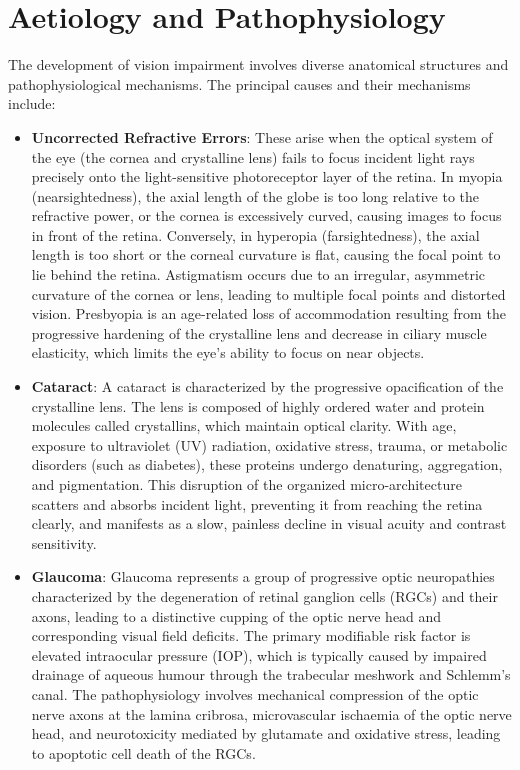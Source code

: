 \section*{Aetiology and Pathophysiology}
The development of vision impairment involves diverse anatomical structures and pathophysiological mechanisms. The principal causes and their mechanisms include:
\begin{itemize}
    \item \textbf{Uncorrected Refractive Errors}: These arise when the optical system of the eye (the cornea and crystalline lens) fails to focus incident light rays precisely onto the light-sensitive photoreceptor layer of the retina. In myopia (nearsightedness), the axial length of the globe is too long relative to the refractive power, or the cornea is excessively curved, causing images to focus in front of the retina. Conversely, in hyperopia (farsightedness), the axial length is too short or the corneal curvature is flat, causing the focal point to lie behind the retina. Astigmatism occurs due to an irregular, asymmetric curvature of the cornea or lens, leading to multiple focal points and distorted vision. Presbyopia is an age-related loss of accommodation resulting from the progressive hardening of the crystalline lens and decrease in ciliary muscle elasticity, which limits the eye's ability to focus on near objects.
    \item \textbf{Cataract}: A cataract is characterized by the progressive opacification of the crystalline lens. The lens is composed of highly ordered water and protein molecules called crystallins, which maintain optical clarity. With age, exposure to ultraviolet (UV) radiation, oxidative stress, trauma, or metabolic disorders (such as diabetes), these proteins undergo denaturing, aggregation, and pigmentation. This disruption of the organized micro-architecture scatters and absorbs incident light, preventing it from reaching the retina clearly, and manifests as a slow, painless decline in visual acuity and contrast sensitivity.
    \item \textbf{Glaucoma}: Glaucoma represents a group of progressive optic neuropathies characterized by the degeneration of retinal ganglion cells (RGCs) and their axons, leading to a distinctive cupping of the optic nerve head and corresponding visual field deficits. The primary modifiable risk factor is elevated intraocular pressure (IOP), which is typically caused by impaired drainage of aqueous humour through the trabecular meshwork and Schlemm's canal. The pathophysiology involves mechanical compression of the optic nerve axons at the lamina cribrosa, microvascular ischaemia of the optic nerve head, and neurotoxicity mediated by glutamate and oxidative stress, leading to apoptotic cell death of the RGCs.

\end{itemize}
